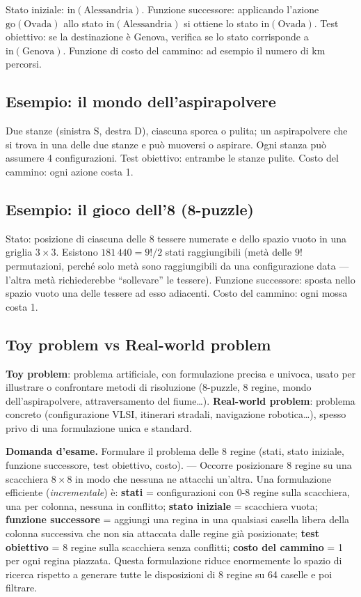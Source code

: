 \documentclass[11pt,a4paper]{report}
\newcommand{\domandaesame}[1]{\begin{esame}\textbf{Domanda d'esame.} #1\end{esame}}
\begin{document}
Stato iniziale: $\text{in}(\text{Alessandria})$. Funzione successore: applicando l'azione $\text{go}(\text{Ovada})$ allo stato $\text{in}(\text{Alessandria})$ si ottiene lo stato $\text{in}(\text{Ovada})$. Test obiettivo: se la destinazione è Genova, verifica se lo stato corrisponde a $\text{in}(\text{Genova})$. Funzione di costo del cammino: ad esempio il numero di km percorsi.

\subsection*{Esempio: il mondo dell'aspirapolvere}

Due stanze (sinistra S, destra D), ciascuna sporca o pulita; un aspirapolvere che si trova in una delle due stanze e può muoversi o aspirare. Ogni stanza può assumere 4 configurazioni. Test obiettivo: entrambe le stanze pulite. Costo del cammino: ogni azione costa 1.

\subsection*{Esempio: il gioco dell'8 (8-puzzle)}

Stato: posizione di ciascuna delle 8 tessere numerate e dello spazio vuoto in una griglia $3\times 3$. Esistono $181\,440 = 9!/2$ stati raggiungibili (metà delle $9!$ permutazioni, perché solo metà sono raggiungibili da una configurazione data --- l'altra metà richiederebbe ``sollevare'' le tessere). Funzione successore: sposta nello spazio vuoto una delle tessere ad esso adiacenti. Costo del cammino: ogni mossa costa 1.

\subsection*{Toy problem vs Real-world problem}

\textbf{Toy problem}: problema artificiale, con formulazione precisa e univoca, usato per illustrare o confrontare metodi di risoluzione (8-puzzle, 8 regine, mondo dell'aspirapolvere, attraversamento del fiume\dots). \textbf{Real-world problem}: problema concreto (configurazione VLSI, itinerari stradali, navigazione robotica\dots), spesso privo di una formulazione unica e standard.

\domandaesame{Formulare il problema delle 8 regine (stati, stato iniziale, funzione successore, test obiettivo, costo). --- Occorre posizionare 8 regine su una scacchiera $8\times 8$ in modo che nessuna ne attacchi un'altra. Una formulazione efficiente (\emph{incrementale}) è: \textbf{stati} = configurazioni con 0-8 regine sulla scacchiera, una per colonna, nessuna in conflitto; \textbf{stato iniziale} = scacchiera vuota; \textbf{funzione successore} = aggiungi una regina in una qualsiasi casella libera della colonna successiva che non sia attaccata dalle regine già posizionate; \textbf{test obiettivo} = 8 regine sulla scacchiera senza conflitti; \textbf{costo del cammino} = 1 per ogni regina piazzata. Questa formulazione riduce enormemente lo spazio di ricerca rispetto a generare tutte le disposizioni di 8 regine su 64 caselle e poi filtrare.}
\end{document}
